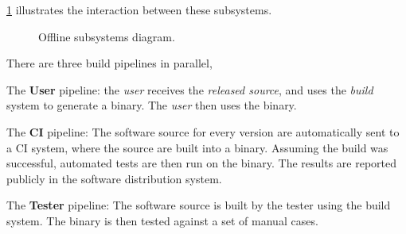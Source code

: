 \cref{fig:offline-diagram} illustrates the interaction between these subsystems.

\begin{figure}
  
  \caption{\label{fig:offline-diagram} Offline subsystems diagram.}
\end{figure}


There are three build pipelines in parallel,
\begin{compactitem}
\item The \textbf{User} pipeline: the \emph{user} receives the \emph{released
    source}, and uses the \emph{build} system to generate a binary. The
    \emph{user} then uses the binary.
  \item The \textbf{\gls{CI}} pipeline: The software source for every version
    are automatically sent to a \gls{CI} system, where the source are built into
    a binary. Assuming the build was successful, automated tests are then run
    on the binary. The results are reported publicly in the software
    distribution system.
  \item The \textbf{Tester} pipeline: The software source is built by the tester
    using the build system. The binary is then tested against a set of manual
    cases.
\end{compactitem}